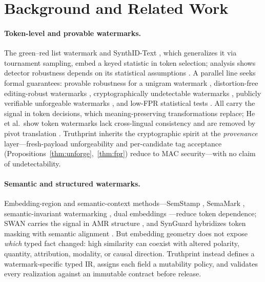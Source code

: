 \documentclass[journal]{IEEEtran}
\begin{document}
\section{Background and Related Work}
\paragraph{Token-level and provable watermarks.}
The green--red list watermark \cite{kirchenbauer2023kgw} and SynthID-Text \cite{dathathri2024synthid,synthidgithub,hf_synthid}, which generalizes it via tournament sampling, embed a keyed statistic in token selection; analysis shows detector robustness depends on its statistical assumptions \cite{omidi2026synthidanalysis}. A parallel line seeks formal guarantees: provable robustness for a unigram watermark \cite{zhao2023provable}, distortion-free editing-robust watermarks \cite{kuditipudi2024distortionfree}, cryptographically undetectable watermarks \cite{christ2024undetectable}, publicly verifiable unforgeable watermarks \cite{liu2024unforgeable}, and low-FPR statistical tests \cite{fernandez2023threebricks}. All carry the signal in token decisions, which meaning-preserving transformations replace; He et al.\ show token watermarks lack cross-lingual consistency and are removed by pivot translation \cite{he2024crosslingual}. Truthprint inherits the cryptographic spirit at the \emph{provenance} layer---fresh-payload unforgeability and per-candidate tag acceptance (Propositions~\ref{thm:unforge},~\ref{thm:fpr}) reduce to MAC security---with no claim of undetectability.

\paragraph{Semantic and structured watermarks.}
Embedding-region and semantic-context methods---SemStamp \cite{hou2024semstamp}, SemaMark \cite{ren2024semmark}, semantic-invariant watermarking \cite{liu2023sir}, dual embeddings \cite{schaefer2026dew}---reduce token dependence; SWAN carries the signal in AMR structure \cite{ye2026swan}, and SynGuard hybridizes token masking with semantic alignment \cite{han2025synguard}. But embedding geometry does not expose \emph{which} typed fact changed: high similarity can coexist with altered polarity, quantity, attribution, modality, or causal direction. Truthprint instead defines a watermark-specific typed IR, assigns each field a mutability policy, and validates every realization against an immutable contract before release.
\end{document}
